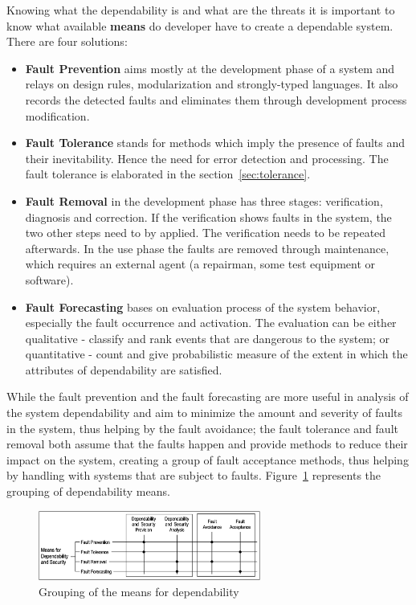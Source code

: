\documentclass[]{myclass}
\begin{document}
Knowing what the dependability is and what are the threats it is important to know what available \textbf{means} do developer have to create a dependable system. There are four solutions:
\begin{itemize}
    \item \textbf{Fault Prevention} aims mostly at the development phase of a system and relays on design rules, modularization and strongly-typed languages. It also records the detected faults and eliminates them through development process modification.
    \item \textbf{Fault Tolerance} stands for methods which imply the presence of faults and their inevitability. Hence the need for error detection and processing. The fault tolerance is elaborated in the {section~\ref*{sec:tolerance}}.
    \item \textbf{Fault Removal} in the development phase has three stages: verification, diagnosis and correction. If the verification shows faults in the system, the two other steps need to by applied. The verification needs to be repeated afterwards. In the use phase the faults are removed through maintenance, which requires an external agent (a repairman, some test equipment or software).
    \item \textbf{Fault Forecasting} bases on evaluation process of the system behavior, especially the fault occurrence and activation. The evaluation can be either qualitative - classify and rank events that are dangerous to the system; or quantitative - count and give probabilistic measure of the extent in which the attributes of dependability are satisfied. 
\end{itemize}
While the fault prevention and the fault forecasting are more useful in analysis of the system dependability and aim to minimize the amount and severity of faults in the system, thus helping by the fault avoidance; the fault tolerance and fault removal both assume that the faults happen and provide methods to reduce their impact on the system, creating a group of fault acceptance methods, thus helping by handling with systems that are subject to faults. {Figure~\ref*{fig:depgroup}} represents the grouping of dependability means.

\begin  {figure}  [H]
\centering
\includegraphics[width=0.65\textwidth]{figures/depgroup.png}
\caption{Grouping of the means for dependability~\cite{art:Avizienis}}
\label{fig:depgroup}
\end {figure}
\end{document}
